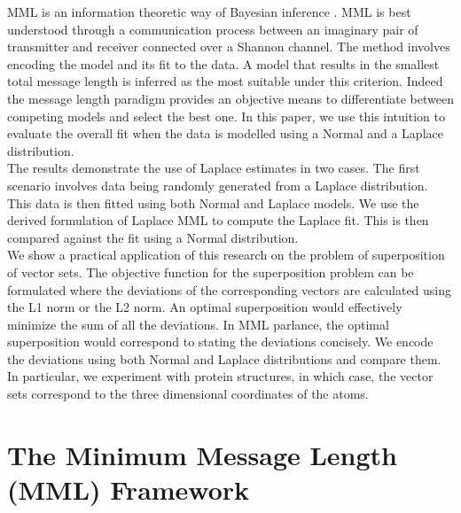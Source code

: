 \documentclass[wcp]{jmlr}
\begin{document}
MML is an information theoretic way of Bayesian inference \citep{wallace68}. MML is best
understood through a communication process between an imaginary pair of transmitter
and receiver connected over a Shannon channel. The method involves
encoding the model and its fit to the data. A model that results in the smallest total message
length is inferred as the most suitable under this criterion. Indeed the message length
paradigm provides an objective means to differentiate between competing models
and select the best one. In this paper, we use this intuition to 
evaluate the overall fit when the data is modelled  using a Normal and a Laplace distribution. \\

The results demonstrate the use of Laplace estimates in two cases. 
The first scenario involves data being randomly
generated from a Laplace distribution. This data is then fitted using
both Normal and Laplace models. We use the derived formulation of Laplace MML to
compute the Laplace fit. This is then compared against the fit using a Normal
distribution. \\

We show a practical application of this research on the problem of superposition of 
vector sets. The objective function for the superposition problem can be formulated
where the deviations of the corresponding vectors are calculated using the L1 norm 
or the L2 norm. An optimal superposition would effectively minimize the sum of all
the deviations. In MML parlance, the optimal superposition would correspond to stating
the deviations concisely. We encode the deviations using both Normal and Laplace
distributions and compare them. In particular, we experiment with protein structures,
in which case, the vector sets correspond to the three dimensional coordinates of the atoms.


\section{The Minimum Message Length (MML) Framework}
\end{document}
